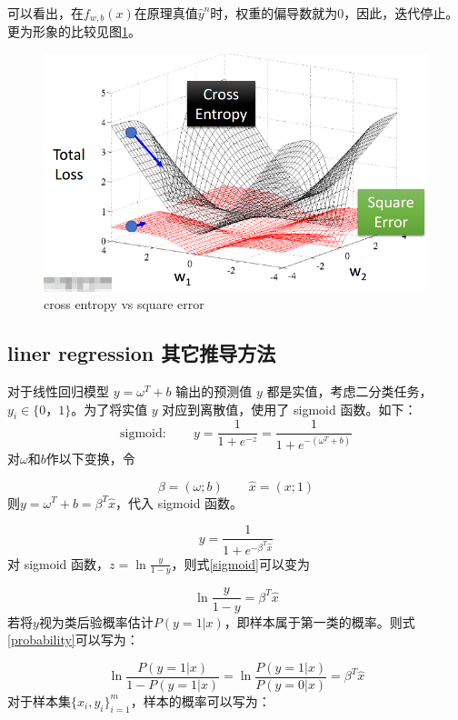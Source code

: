 可以看出，在$f_{w,b}(x)$在原理真值$\hat{y}^n$时，权重的偏导数就为0，因此，迭代停止。更为形象的比较见图\ref{fig:cross_entropy_vs_square_error}。
\begin{figure}[htb]
	\centering
	\includegraphics[scale=0.4]{pic/cross_entropy_vs_square_error}
	\caption{cross entropy vs square error}
	\label{fig:cross_entropy_vs_square_error}
\end{figure}

\subsection{liner regression 其它推导方法}

对于线性回归模型 $y=\omega^T+b$ 输出的预测值 $y$ 都是实值，考虑二分类任务，$y_i\in\{0，1\}$。为了将实值 $y$ 对应到离散值，使用了 sigmoid 函数。如下：
\[
\mathrm{sigmoid:} \qquad y=\frac{1}{1+e^{-z}}=\frac{1}{1+e^{-(\omega^T+b)}}
\] 
对$\omega$和$b$作以下变换，令

\[
\beta=(\omega;b) \qquad \hat{x}=(x;1)
\]
则$y=\omega^T+b=\beta^T\hat{x}$，代入 sigmoid 函数。

\begin{equation}\label{sigmoid}
y=\frac{1}{1+e^{-\beta^T\hat{x}}}
\end{equation}
对 sigmoid 函数，$z=\ln\frac{y}{1-y}$，则式\eqref{sigmoid}可以变为

\begin{equation}\label{probability}
\ln\frac{y}{1-y}=\beta^T\hat{x}
\end{equation}
若将$y$视为类后验概率估计$P(y=1|x)$，即样本属于第一类的概率。则式\eqref{probability}可以写为：

\[
\ln\frac{P(y=1|x)}{1-P(y=1|x)}=\ln\frac{P(y=1|x)}{P(y=0|x)}=\beta^T\hat{x}
\]
对于样本集$\{x_i,y_i\}^{m}_{i=1}$，样本的概率可以写为：

